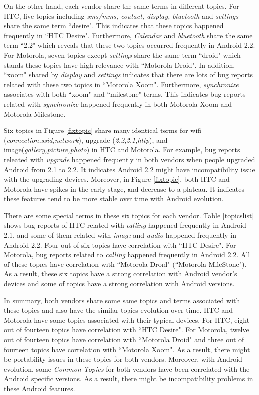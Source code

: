 \documentclass[10pt, conference, compsocconf]{IEEEtran}
\begin{document}
On the other hand, each vendor share the same terms in different
topics. For HTC, five topics including \textit{sms\//mms, contact,
  display, bluetooth} and \textit{settings} share the same term
``desire". This indicates that these topics happened frequently in
``HTC Desire". Furthermore, \textit{Calendar} and \textit{bluetooth}
share the same term ``2.2" which reveals that these two topics
occurred frequently in Android 2.2. For Motorola, seven topics except
\textit{settings} share the same term ``droid" which stands these
topics have high relevance with ``Motorola Droid". In addition,
``xoom" shared by \textit{display} and \textit{settings} indicates
that there are lots of bug reports related with these two topics in
``Motorola Xoom". Furthermore, \textit{synchronize} associates with
both ``xoom" and ``milestone" terms. This indicates bug reports
related with \textit{synchronize} happened frequently in both Motorola
Xoom and Motorola Milestone.

Six topics in Figure \ref{fixtopic} share many identical terms for
wifi (\textit{connection,ssid,network}), upgrade
(\textit{2.2,2.1,http}), and image(\textit{gallery,picture,photo}) in
HTC and Motorola. For example, bug reports releated with
\textit{upgrade} happened frequently in both vendors when people
upgraded Android from 2.1 to 2.2. It indicates Android 2.2 might have
incompatibility issue with the upgrading devices. Moreover, in Figure
\ref{fixtopic}, both HTC and Motorola have spikes in the early stage,
and decrease to a plateau. It indicates these features tend to be more
stable over time with Android evolution.

There are some special terms in these six topics for each
vendor. Table \ref{topicslist} shows bug reports of HTC related with
\textit{calling} happened frequently in Android 2.1, and some of them
related with \textit{image} and \textit{audio} happened frequently in
Android 2.2. Four out of six topics have correlation with ``HTC
Desire". For Motorola, bug reports related to \textit{calling}
happened frequently in Android 2.2. All of these topics have
correlation with ``Motorola Droid" (``Motorola MileStone"). As a
result, these six topics have a strong correlation with Android
vendor's devices and some of topics have a strong correlation with
Android versions.

In summary, both vendors share some same topics and terms associated
with these topics and also have the similar topics evolution over
time. HTC and Motorola have some topics associated with their typical
devices. For HTC, eight out of fourteen topics have correlation with
``HTC Desire". For Motorola, twelve out of fourteen topics have
correlation with ``Motorola Droid" and three out of fourteen topics
have correlation with ``Motorola Xoom". As a result, there might be
portability issues in these topics for both vendors. Moreover, with
Android evolution, some \textit{Common Topics} for both vendors have
been correlated with the Android specific versions. As a result, there
might be incompatibility problems in these Android features.
\end{document}
